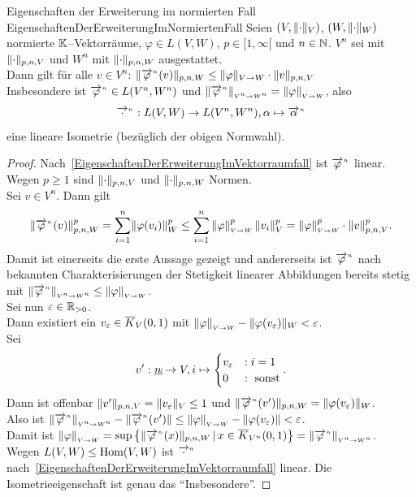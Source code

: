 \begin{lemma}{Eigenschaften der Erweiterung im normierten Fall}
             {EigenschaftenDerErweiterungImNormiertenFall}
Seien $(V, \lVert\cdot\rVert_V)$, $(W, \lVert\cdot\rVert_W)$ normierte $\mathbb{K}$--Vektorräume,
$\varphi \in L(V, W)$, $p \in [1, \infty[$ und $n \in \mathbb{N}$. $V^n$ sei mit
$\lVert\cdot\rVert_{p, n, V}$ und $W^n$ mit $\lVert\cdot\rVert_{p, n, W}$ ausgestattet.\\
Dann gilt für alle $v \in V^n$:
    $\lVert{\overrightarrow{\varphi}}^{{}_n}(v)\rVert_{p, n, W}
    \le \lVert\varphi\rVert_{V \rightarrow W}\cdot \lVert v\rVert_{p, n, V}$\\
Insbesondere ist ${\overrightarrow{\varphi}}^{{}_n} \in L(V^n, W^n)$
und $\left\|{\overrightarrow{\varphi}}^{{}_n}\right\|_{\scriptscriptstyle{V^n \rightarrow W^n}} = \left\|\varphi\right\|_{\scriptscriptstyle{V \rightarrow W}}$, also
\[{\overrightarrow{\cdot}}^{{}_n}: L(V, W) \rightarrow L(V^n, W^n), 
  \alpha \mapsto {\overrightarrow{\alpha}}^{{}_n}\]
eine lineare Isometrie (bezüglich der obigen Normwahl).
\end{lemma}
\begin{proof}
Nach~\ref{EigenschaftenDerErweiterungImVektorraumfall} ist ${\overrightarrow{\varphi}}^{{}_n}$
linear.\\
Wegen $p \ge 1$ sind $\lVert\cdot\rVert_{p, n, V}$ und $\lVert\cdot\rVert_{p,n,W}$ Normen.\\
Sei $v \in V^n$.
Dann gilt\[
       \lVert{\overrightarrow{\varphi}}^{{}_n} (v)\rVert_{p, n, W}^p
   =   \sum_{i=1}^n \lVert\varphi(v_i)\rVert_W^p
   \le \sum_{i=1}^n \left\|\varphi\right\|_{\scriptscriptstyle{V \rightarrow W}}^p \lVert v_i\rVert_V^p
   =   \left\|\varphi\right\|_{\scriptscriptstyle{V \rightarrow W}} ^p \cdot \lVert v\rVert _{p, n, V}^p\text.\]
Damit ist einerseits die erste Aussage gezeigt und andererseits ist 
${\overrightarrow{\varphi}}^{{}_n}$ nach bekannten Charakterisierungen der Stetigkeit linearer
Abbildungen bereits stetig mit
$\left\|{\overrightarrow{\varphi}}^{{}_n}\right\|_{\scriptscriptstyle{V^n \rightarrow W^n}} \le \left\|\varphi\right\|_{\scriptscriptstyle{V \rightarrow W}}$.\\
Sei nun $\varepsilon \in \mathbb{R}_{>0}$.\\
Dann existiert ein $v_\varepsilon \in \overline K_V(0,1)$ mit
$\left\|\varphi\right\|_{\scriptscriptstyle{V \rightarrow W}} - \lVert\varphi(v_\varepsilon)\rVert_W< \varepsilon$.\\
Sei
\[v' :\haken n \rightarrow V, i \mapsto \begin{cases}v_\eps & : i=1\\
0 &: \text{ sonst} \end{cases}\text.\]
Dann ist offenbar $\lVert v'\rVert_{p, n, V} = \lVert v_\varepsilon\rVert_V \le 1$ und
$\lVert{\overrightarrow{\varphi}}^{{}_n} (v')\rVert_{p, n, W} = \lVert\varphi(v_\varepsilon)\rVert_W$.\\
Also ist $
 \left\|{\overrightarrow{\varphi}}^{{}_n}\right\|_{\scriptscriptstyle{V^n \rightarrow W^n}} - \lVert{\overrightarrow{\varphi}}^{{}_n} (v')\rVert
 \le \left\|\varphi\right\|_{\scriptscriptstyle{V \rightarrow W}} - \lVert\varphi(v_\varepsilon)\rVert < \varepsilon$.\\
Damit ist $\left\|\varphi\right\|_{\scriptscriptstyle{V \rightarrow W}}
 = \sup\left\{\lVert{\overrightarrow{\varphi}}^{{}_n} (x)\rVert_{p,n,W}\,|\,x \in \overline K_{V^n}(0,1)\right\}
 = \left\|{\overrightarrow{\varphi}}^{{}_n}\right\|_{\scriptscriptstyle{V^n \rightarrow W^n}}$.\\
Wegen $L(V, W) \le \mathop{\textrm{Hom}}\nolimits(V, W)$ ist ${\overrightarrow{\cdot}}^{{}_n}$ nach~\ref{EigenschaftenDerErweiterungImVektorraumfall} linear.
Die Isometrieeigenschaft ist genau das \enquote{Insbesondere}.
\end{proof}